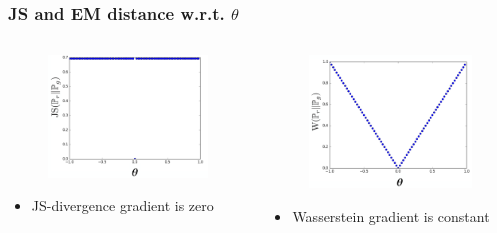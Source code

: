\documentclass{Bredelebeamer}
\begin{document}
\begin{frame}
	\frametitle{JS and EM distance w.r.t. $\theta$ }
	\begin{columns}
	\begin{column}{0.5\textwidth}
	\begin{figure}[h!]
		\centering
		\includegraphics[width=\textwidth]{JS_value.png}
	\end{figure}
	\pause
	\begin{itemize}
		\item JS-divergence gradient is zero
	\end{itemize}
	\end{column}
	\begin{column}{0.5\textwidth}  %
	\pause
	\begin{figure}[h!]
		\centering
		\includegraphics[width=\textwidth]{wasserstein_value.png}
	\end{figure}
	\pause
	\begin{itemize}
		\item Wasserstein gradient is constant
	\end{itemize}
	\end{column}
	\end{columns}
\end{frame}
\end{document}

